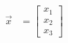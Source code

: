 \begin{align}
    \vec{x} &= \begin{bmatrix}
           x_{1} \\
           x_{2} \\
           x_{3}
         \end{bmatrix}
\end{align}